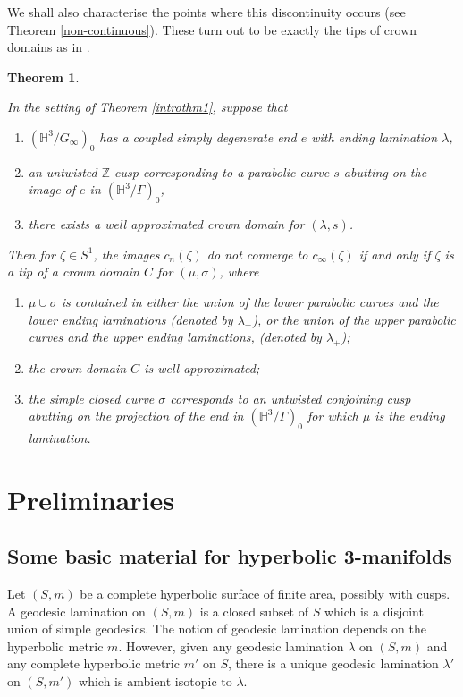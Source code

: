 \documentclass{amsart}
\newtheorem{theorem}{Theorem}[section]
\theoremstyle{definition}
\newcommand{\integers}{\mathbb{Z}}
\newcommand\HHH{{\mathbb H}}
\begin{document}
We shall also characterise the points where this discontinuity occurs (see Theorem \ref{non-continuous}). These turn out to be exactly the tips of crown domains as in \cite{mahan-series2}.
	
\begin{theorem}
	\label{introthm2}{\rm
	In the setting of Theorem \ref{introthm1}, suppose that
	\begin{enumerate}
	\item  $(\HHH^3/G_\infty)_0$ has a coupled simply degenerate end $e$ with  ending lamination $\lambda$,
	\item an untwisted $\integers$-cusp corresponding to a parabolic curve $s$ abutting on the image of $e$ in $(\HHH^3/\Gamma)_0$,
	\item  there exists a well approximated crown domain for $(\lambda,s)$.
	\end{enumerate}
	 
	Then for $\zeta \in S^1$, the images $c_n(\zeta)$ do not converge to $c_\infty(\zeta)$ if and only if $\zeta$ is a tip of a crown domain $C$ for $(\mu, \sigma)$, where 
	
	\begin{enumerate}
		\item
		$\mu \cup \sigma$ is contained  in either the union of the lower parabolic curves and the lower ending laminations (denoted by $\lambda_-$), or the union of  the upper parabolic curves and the upper ending laminations, (denoted by  $\lambda_+$);
		\item 
		the crown domain $C$ is well approximated; 
		\item
		the simple closed curve $\sigma$  corresponds to an  untwisted conjoining cusp abutting on the projection of the end  in $(\HHH^3/\Gamma)_0$ for which $\mu$ is the ending lamination.
	\end{enumerate}}
	\end{theorem}


\section{Preliminaries}
\subsection{Some basic material for hyperbolic 3-manifolds}
Let $(S,m)$ be a complete hyperbolic surface of finite area, possibly with cusps.
A geodesic lamination on $(S,m)$ is a closed subset of $S$ which is a disjoint union of simple geodesics.
The notion of geodesic lamination depends on the hyperbolic metric $m$.
However, given any geodesic lamination $\lambda$ on $(S,m)$ and any  complete hyperbolic metric $m'$ on $S$, there is a unique geodesic lamination $\lambda'$ on $(S,m')$ which is ambient isotopic to $\lambda$.
\end{document}
